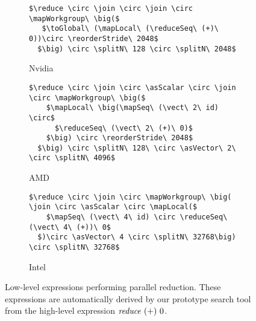 \begin{figure*}[t]
\captionsetup[subfigure]{justification=justified,singlelinecheck=false}

\begin{subfigure}[b]{\linewidth}
\vspace{.4em}
\begin{minipage}{.15\linewidth}
\caption{Nvidia}
\label{fig:reduce:expr:auto:1}
\end{minipage}
\hfill
\begin{minipage}{.8\linewidth}
\begin{lstlisting}[mathescape, basicstyle=\small\rmfamily]
$\reduce \circ \join \circ \join \circ \mapWorkgroup\ \big($
   $\toGlobal\ (\mapLocal\ (\reduceSeq\ (+)\ 0))\circ \reorderStride\ 2048$
  $\big) \circ \splitN\ 128 \circ \splitN\ 2048$
\end{lstlisting}
\end{minipage}
\end{subfigure}

\begin{subfigure}[b]{\linewidth}
\vspace{0em}
\begin{minipage}{.15\linewidth}
\caption{AMD}
\label{fig:reduce:expr:auto:2}
\end{minipage}
\hfill
\begin{minipage}{.8\linewidth}
\begin{lstlisting}[mathescape, basicstyle=\small\rmfamily]
$\reduce \circ \join \circ \asScalar \circ \join \circ \mapWorkgroup\ \big($
    $\mapLocal\ \big(\mapSeq\ (\vect\ 2\ id) \circ$
      $\reduceSeq\ (\vect\ 2\ (+)\ 0)$
    $\big) \circ \reorderStride\ 2048$
  $\big) \circ \splitN\ 128\ \circ \asVector\ 2\ \circ \splitN\ 4096$
\end{lstlisting}
\end{minipage}
\end{subfigure}

\begin{subfigure}[b]{\linewidth}
\vspace{0em}
\begin{minipage}{.15\linewidth}
\caption{Intel}
\label{fig:reduce:expr:auto:3}
\end{minipage}
\hfill
\begin{minipage}{.8\linewidth}
\begin{lstlisting}[mathescape, basicstyle=\small\rmfamily]
$\reduce \circ \join \circ \mapWorkgroup\ \big( \join \circ \asScalar \circ \mapLocal($
    $\mapSeq\ (\vect\ 4\ id) \circ \reduceSeq\ (\vect\ 4\ (+))\ 0$
  $)\circ \asVector\ 4 \circ \splitN\ 32768\big) \circ \splitN\ 32768$
\end{lstlisting}
\end{minipage}
\end{subfigure}

\caption[Low-level expressions performing parallel reduction. These expressions are automatically derived by our prototype search tool from a high-level expression]{Low-level expressions performing parallel reduction. These expressions are automatically derived by our prototype search tool from the  high-level expression $\reduce\ (+)\ 0$.}
\label{fig:reduce:expr:auto}
\end{figure*}

